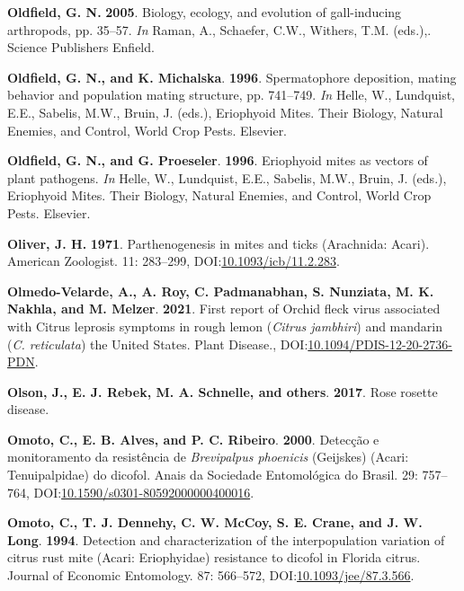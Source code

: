 \documentclass[12pt,final,CPage]{ufthesis}
\newlength{\cslhangindent}
\newenvironment{CSLReferences}[2] %
{%
	\setlength{\parindent}{0pt}
	\ifodd #1 \everypar{\setlength{\hangindent}{\cslhangindent}}\ignorespaces\fi
	\ifnum #2 > 0
	\setlength{\parskip}{#2\baselineskip}
	\fi
}%
{}
\begin{document}
{\begin{CSLReferences}{1}{0}
  \leavevmode{}%
  \textbf{Oldfield, G. N.} \textbf{2005}. Biology, ecology, and evolution of gall-inducing arthropods, pp. 35--57. \emph{In} Raman, A., Schaefer, C.W., Withers, T.M. (eds.),. Science Publishers Enfield.

  \leavevmode{}%
  \textbf{Oldfield, G. N., and K. Michalska}. \textbf{1996}. Spermatophore deposition, mating behavior and population mating structure, pp. 741--749. \emph{In} Helle, W., Lundquist, E.E., Sabelis, M.W., Bruin, J. (eds.), Eriophyoid Mites. Their Biology, Natural Enemies, and Control, World Crop Pests. Elsevier.

  \leavevmode{}%
  \textbf{Oldfield, G. N., and G. Proeseler}. \textbf{1996}. Eriophyoid mites as vectors of plant pathogens. \emph{In} Helle, W., Lundquist, E.E., Sabelis, M.W., Bruin, J. (eds.), Eriophyoid Mites. Their Biology, Natural Enemies, and Control, World Crop Pests. Elsevier.

  \leavevmode{}%
  \textbf{Oliver, J. H.} \textbf{1971}. Parthenogenesis in mites and ticks ({Arachnida}: {Acari}). American Zoologist. 11: 283--299, DOI:\href{https://doi.org/10.1093/icb/11.2.283}{10.1093/icb/11.2.283}.

  \leavevmode{}%
  \textbf{Olmedo-Velarde, A., A. Roy, C. Padmanabhan, S. Nunziata, M. K. Nakhla, and M. Melzer}. \textbf{2021}. First report of {Orchid fleck virus} associated with {Citrus leprosis} symptoms in rough lemon ({\emph{Citrus jambhiri}}) and mandarin ({\emph{C. reticulata}}) the {United States}. Plant Disease., DOI:\href{https://doi.org/10.1094/PDIS-12-20-2736-PDN}{10.1094/PDIS-12-20-2736-PDN}.

  \leavevmode{}%
  \textbf{Olson, J., E. J. Rebek, M. A. Schnelle, and others}. \textbf{2017}. Rose rosette disease.

  \leavevmode{}%
  \textbf{Omoto, C., E. B. Alves, and P. C. Ribeiro}. \textbf{2000}. Detec{ç}{ã}o e monitoramento da resist{ê}ncia de {\emph{Brevipalpus phoenicis}} ({Geijskes}) ({Acari}: {Tenuipalpidae}) do dicofol. Anais da Sociedade Entomol{ó}gica do Brasil. 29: 757--764, DOI:\href{https://doi.org/10.1590/s0301-80592000000400016}{10.1590/s0301-80592000000400016}.

  \leavevmode{}%
  \textbf{Omoto, C., T. J. Dennehy, C. W. McCoy, S. E. Crane, and J. W. Long}. \textbf{1994}. Detection and characterization of the interpopulation variation of citrus rust mite ({Acari}: {Eriophyidae}) resistance to dicofol in {Florida} citrus. Journal of Economic Entomology. 87: 566--572, DOI:\href{https://doi.org/10.1093/jee/87.3.566}{10.1093/jee/87.3.566}.


\end{CSLReferences}}
\end{document}
